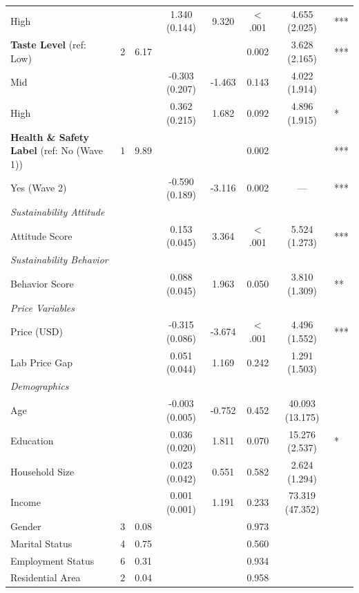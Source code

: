 \begin{center}
\begin{longtable}{lccccccl}
\qquad High & & & 1.340 (0.144) & 9.320 & $<$.001 & 4.655 (2.025) & *** \\
\quad \textbf{Taste Level} (ref: Low) & 2 & 6.17 & & & 0.002 & 3.628 (2.165) & *** \\
\qquad Mid & & & -0.303 (0.207) & -1.463 & 0.143 & 4.022 (1.914) &  \\
\qquad High & & & 0.362 (0.215) & 1.682 & 0.092 & 4.896 (1.915) & * \\
\quad \textbf{Health \& Safety Label} (ref: No (Wave 1)) & 1 & 9.89 & & & 0.002 &  & *** \\
\qquad Yes (Wave 2) & & & -0.590 (0.189) & -3.116 & 0.002 & --- & *** \\
\multicolumn{8}{l}{\textit{Sustainability Attitude}} \\
\quad Attitude Score & & & 0.153 (0.045) & 3.364 & $<$.001 & 5.524 (1.273) & *** \\
\multicolumn{8}{l}{\textit{Sustainability Behavior}} \\
\quad Behavior Score & & & 0.088 (0.045) & 1.963 & 0.050 & 3.810 (1.309) & ** \\
\multicolumn{8}{l}{\textit{Price Variables}} \\
\quad Price (USD) & & & -0.315 (0.086) & -3.674 & $<$.001 & 4.496 (1.552) & *** \\
\quad Lab Price Gap & & & 0.051 (0.044) & 1.169 & 0.242 & 1.291 (1.503) &  \\
\multicolumn{8}{l}{\textit{Demographics}} \\
\quad Age & & & -0.003 (0.005) & -0.752 & 0.452 & 40.093 (13.175) &  \\
\quad Education & & & 0.036 (0.020) & 1.811 & 0.070 & 15.276 (2.537) & * \\
\quad Household Size & & & 0.023 (0.042) & 0.551 & 0.582 & 2.624 (1.294) &  \\
\quad Income & & & 0.001 (0.001) & 1.191 & 0.233 & 73.319 (47.352) &  \\
\quad Gender & 3 & 0.08 & & & 0.973 & &  \\
\quad Marital Status & 4 & 0.75 & & & 0.560 & &  \\
\quad Employment Status & 6 & 0.31 & & & 0.934 & &  \\
\quad Residential Area & 2 & 0.04 & & & 0.958 & &  \\
\end{longtable}
\end{center}
